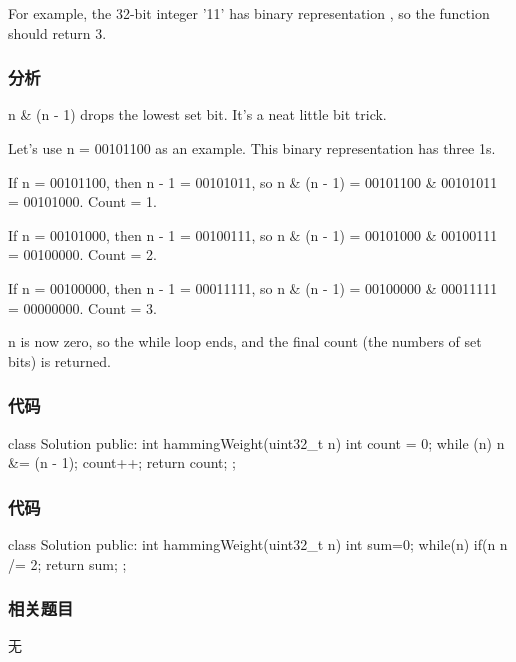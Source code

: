 For example, the 32-bit integer ’11' has binary representation , so the function should return 3.

\subsubsection{分析}

n \& (n - 1) drops the lowest set bit. It's a neat little bit trick.

Let's use n = 00101100 as an example. This binary representation has three 1s.

If n = 00101100, then n - 1 = 00101011, so n \& (n - 1) = 00101100 \& 00101011 = 00101000. Count = 1.

If n = 00101000, then n - 1 = 00100111, so n \& (n - 1) = 00101000 \& 00100111 = 00100000. Count = 2.

If n = 00100000, then n - 1 = 00011111, so n \& (n - 1) = 00100000 \& 00011111 = 00000000. Count = 3.

n is now zero, so the while loop ends, and the final count (the numbers of set bits) is returned.

\subsubsection{代码}
\begin{Code}
class Solution {
public:
    int hammingWeight(uint32_t n) {
        int count = 0;
        while (n) {
            n &= (n - 1);
            count++;
        }
        return count;
    }
};
\end{Code}

\subsubsection{代码}
\begin{Code}
class Solution {
public:
    int hammingWeight(uint32_t n) {
        int sum=0;
        while(n) {
            if(n %
            n /= 2; 
        }
        return sum;
    }
};
\end{Code}

\subsubsection{相关题目}

\begindot
\item 无
\myenddot